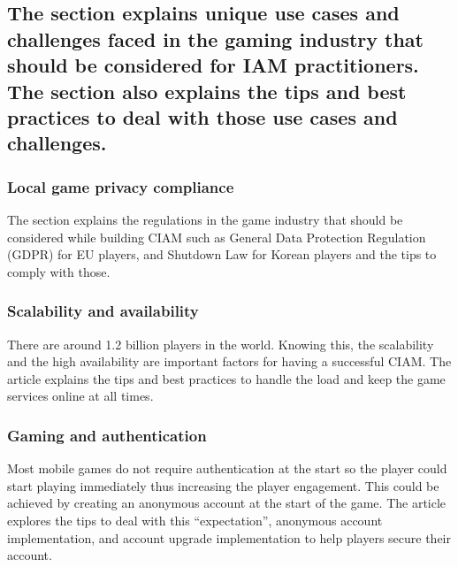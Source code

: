 \hypertarget{the-section-explains-unique-use-cases-and-challenges-faced-in-the-gaming-industry-that-should-be-considered-for-iam-practitioners.-the-section-also-explains-the-tips-and-best-practices-to-deal-with-those-use-cases-and-challenges.}{%
\subsection{The section explains unique use cases and challenges
faced in the gaming industry that should be considered for IAM
practitioners. The section also explains the tips and best practices to
deal with those use cases and
challenges.}\label{the-section-explains-unique-use-cases-and-challenges-faced-in-the-gaming-industry-that-should-be-considered-for-iam-practitioners.-the-section-also-explains-the-tips-and-best-practices-to-deal-with-those-use-cases-and-challenges.}}

\hypertarget{local-game-privacy-compliance}{%
\subsubsection{Local game privacy
compliance}\label{local-game-privacy-compliance}}

The section explains the regulations in the game industry that should be
considered while building CIAM such as General Data Protection
Regulation (GDPR) for EU players, and Shutdown Law for Korean players
and the tips to comply with those.

\hypertarget{scalability-and-availability}{%
\subsubsection{Scalability and availability
}\label{scalability-and-availability}}

There are around 1.2 billion players in the world. Knowing this, the
scalability and the high availability are important factors for having a
successful CIAM. The article explains the tips and best practices to
handle the load and keep the game services online at all times.~

\hypertarget{gaming-and-authentication}{%
\subsubsection{Gaming and authentication}\label{gaming-and-authentication}}

Most mobile games do not require authentication at the start so the
player could start playing immediately thus increasing the player
engagement. This could be achieved by creating an anonymous account at
the start of the game. The article explores the tips to deal with this
``expectation'', anonymous account implementation, and account upgrade
implementation to help players secure their account.

